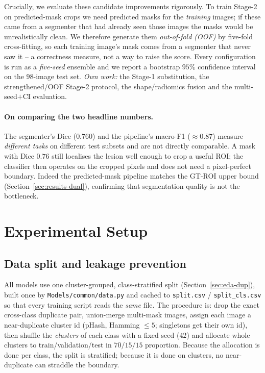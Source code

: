 \documentclass[11pt]{article}
\begin{document}
Crucially, we evaluate these candidate improvements rigorously. To train Stage-2
on predicted-mask crops we need predicted masks for the \emph{training} images; if
these came from a segmenter that had already seen those images the masks would be
unrealistically clean. We therefore generate them \emph{out-of-fold (OOF)} by
five-fold cross-fitting, so each training image's mask comes from a segmenter that
never saw it -- a correctness measure, not a way to raise the score. Every
configuration is run as a \emph{five-seed} ensemble and we report a bootstrap
$95\%$ confidence interval on the $98$-image test set. \emph{Own work:} the Stage-1
substitution, the strengthened/OOF Stage-2 protocol, the shape/radiomics fusion
and the multi-seed$+$CI evaluation.

\paragraph{On comparing the two headline numbers.}
The segmenter's Dice ($0.760$) and the pipeline's macro-F1 ($\approx 0.87$) measure
\emph{different tasks} on different test subsets and are not directly comparable. A
mask with Dice $0.76$ still localises the lesion well enough to crop a useful ROI;
the classifier then operates on the cropped pixels and does not need a
pixel-perfect boundary. Indeed the predicted-mask pipeline matches the GT-ROI
upper bound (Section~\ref{sec:results-dual}), confirming that segmentation quality
is not the bottleneck.

\section{Experimental Setup}
\label{sec:setup}
\subsection{Data split and leakage prevention}
\label{sec:setup-split}
All models use one cluster-grouped, class-stratified split
(Section~\ref{sec:eda-dup}), built once by \texttt{Models/\allowbreak common/\allowbreak data.py} and cached
to \texttt{split.csv} / \texttt{split\_cls.csv} so that every training script reads
the \emph{same} file. The procedure is: drop the exact cross-class duplicate pair,
union-merge multi-mask images, assign each image a near-duplicate cluster id
(pHash, Hamming $\leq 5$; singletons get their own id), then shuffle the
\emph{clusters} of each class with a fixed seed ($42$) and allocate whole clusters
to train/validation/test in $70/15/15$ proportion. Because the allocation is done
per class, the split is stratified; because it is done on clusters, no
near-duplicate can straddle the boundary.
\end{document}
